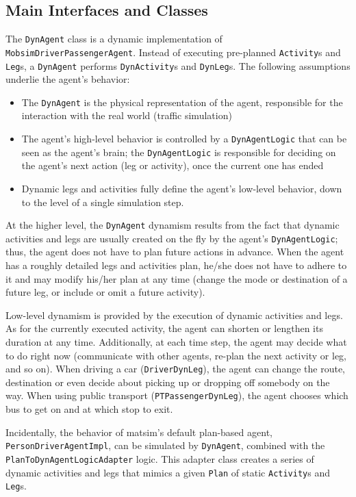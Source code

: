 \subsection{Main Interfaces and Classes}
The \lstinline$DynAgent$ class is a dynamic implementation of \lstinline$MobsimDriverPassengerAgent$. Instead of executing pre-planned \lstinline$Activity$s and \lstinline$Leg$s, a \lstinline$DynAgent$ performs \lstinline$DynActivity$s and \lstinline$DynLeg$s. The following assumptions underlie the agent's behavior:
%
\begin{itemize}\styleItemize
	\item The \lstinline$DynAgent$ is the physical representation of the agent, responsible for the interaction with the real world (\ie traffic simulation)

	\item The agent's high-level behavior is controlled by a \lstinline$DynAgentLogic$ that can be seen as the agent's brain; the \lstinline$DynAgentLogic$ is responsible for deciding on the agent's next action (leg or activity), once the current one has ended
	
	\item Dynamic legs and activities fully define the agent's low-level behavior, down to the level of a single simulation step.
\end{itemize}
%
At the higher level, the \lstinline$DynAgent$ dynamism results from the fact that dynamic activities and legs are usually created on the fly by the agent's \lstinline$DynAgentLogic$; thus, the agent does not have to plan future actions in advance. When the agent has a roughly detailed legs and activities plan, he/she does not have to adhere to it and may modify his/her plan at any time (\eg change the mode or destination of a future leg, or include or omit a future activity).

Low-level dynamism is provided by the execution of dynamic activities and legs. As for the currently executed activity, the agent can shorten or lengthen its duration at any time. Additionally, at each time step, the agent may decide what to do right now (\eg communicate with other agents, re-plan the next activity or leg, and so on). When driving a car (\lstinline$DriverDynLeg$), the agent can change the route, destination or even decide about picking up or dropping off somebody on the way. When using public transport (\lstinline$PTPassengerDynLeg$), the agent chooses which bus to get on and at which stop to exit.

Incidentally, the behavior of \gls{matsim}'s default plan-based agent, \lstinline$PersonDriverAgentImpl$, can be simulated by \lstinline$DynAgent$, combined with the \lstinline$PlanToDynAgentLogicAdapter$ logic. This adapter class creates a series of dynamic activities and legs that mimics a given \lstinline$Plan$ of static \lstinline$Activity$s and \lstinline$Leg$s.

